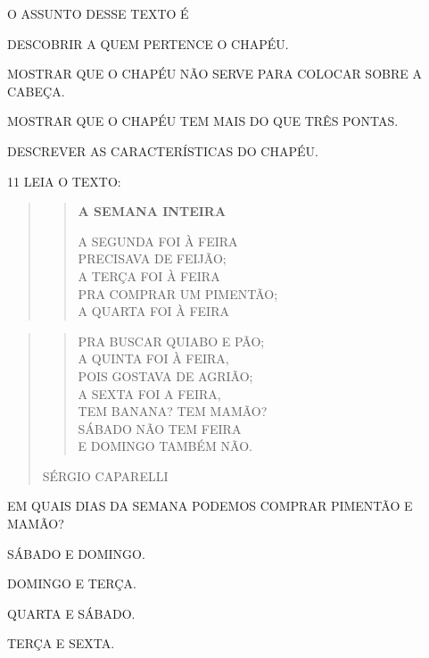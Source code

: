 O ASSUNTO DESSE TEXTO É

\begin{escolha}
\item DESCOBRIR A QUEM PERTENCE O CHAPÉU.

\item MOSTRAR QUE O CHAPÉU NÃO SERVE PARA COLOCAR SOBRE A CABEÇA.

\item MOSTRAR QUE O CHAPÉU TEM MAIS DO QUE TRÊS PONTAS.

\item DESCREVER AS CARACTERÍSTICAS DO CHAPÉU.
\end{escolha}


\num{11} LEIA O TEXTO:

\begin{quote}
\begin{verse}
\textbf{A SEMANA INTEIRA}

A SEGUNDA FOI À FEIRA\\
PRECISAVA DE FEIJÃO;\\
A TERÇA FOI À FEIRA\\
PRA COMPRAR UM PIMENTÃO;\\
A QUARTA FOI À FEIRA
\end{verse}
\end{quote}


\begin{quote}
\begin{verse}
PRA BUSCAR QUIABO E PÃO;\\
A QUINTA FOI À FEIRA,\\
POIS GOSTAVA DE AGRIÃO;\\
A SEXTA FOI A FEIRA,\\
TEM BANANA? TEM MAMÃO?\\
SÁBADO NÃO TEM FEIRA\\
E DOMINGO TAMBÉM NÃO.
\end{verse}

\begin{flushright}
SÉRGIO CAPARELLI
\end{flushright}
\end{quote}


EM QUAIS DIAS DA SEMANA PODEMOS COMPRAR PIMENTÃO E MAMÃO?

\begin{escolha}
\item SÁBADO E DOMINGO.

\item DOMINGO E TERÇA.

\item QUARTA E SÁBADO.

\item TERÇA E SEXTA.
\end{escolha}

